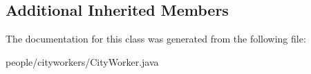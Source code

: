 \subsection*{Additional Inherited Members}


The documentation for this class was generated from the following file\+:\begin{DoxyCompactItemize}
\item 
people/cityworkers/City\+Worker.\+java\end{DoxyCompactItemize}
